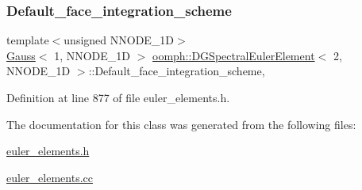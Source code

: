 \subsubsection{\texorpdfstring{Default\+\_\+face\+\_\+integration\+\_\+scheme}{Default\_face\_integration\_scheme}}
{\footnotesize\ttfamily template$<$unsigned N\+N\+O\+D\+E\+\_\+1D$>$ \\
\hyperlink{classoomph_1_1Gauss}{Gauss}$<$ 1, N\+N\+O\+D\+E\+\_\+1D $>$ \hyperlink{classoomph_1_1DGSpectralEulerElement}{oomph\+::\+D\+G\+Spectral\+Euler\+Element}$<$ 2, N\+N\+O\+D\+E\+\_\+1D $>$\+::Default\+\_\+face\+\_\+integration\+\_\+scheme\hspace{0.3cm}{\ttfamily [static]}, {\ttfamily [private]}}



Definition at line 877 of file euler\+\_\+elements.\+h.



The documentation for this class was generated from the following files\+:\begin{DoxyCompactItemize}
\item 
\hyperlink{euler__elements_8h}{euler\+\_\+elements.\+h}\item 
\hyperlink{euler__elements_8cc}{euler\+\_\+elements.\+cc}\end{DoxyCompactItemize}
